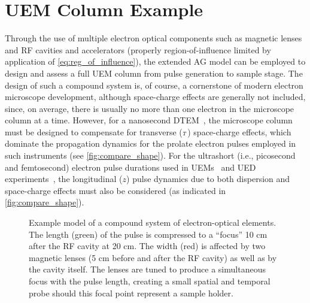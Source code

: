 
\section{UEM Column Example} \label{sec:compound}

Through the use of multiple electron optical components such as magnetic lenses and RF cavities and accelerators (properly region-of-influence limited by application of \ref{eq:reg_of_influence}), the extended AG model can be employed to design and assess a full UEM column from pulse generation to sample stage.
The design of such a compound system is, of course, a cornerstone of modern electron microscope development, although space-charge effects are generally not included, since, on average, there is usually no more than one electron in the microscope column at a time.
However, for a nanosecond DTEM~\cite{lagrange_nanosecond_2008,reed_evolution_2009}, the microscope column must be designed to compensate for transverse (${\scriptscriptstyle T}$) space-charge effects, which dominate the propagation dynamics for the prolate electron pulses employed in such instruments (see \ref{fig:compare_shape}).
For the ultrashort (i.e., picosecond and femtosecond) electron pulse durations used in UEMs~\cite{park_direct_2009} and UED experiments~\cite{oudheusden_electron_2007}, the longitudinal ($z$) pulse dynamics due to both dispersion and space-charge effects must also be considered (as indicated in \ref{fig:compare_shape}).

\begin{figure}
  \centering
  
  \caption[Example model of a compound system of electron-optical elements]{
    Example model of a compound system of electron-optical elements.
    The length (green) of the pulse is compressed to a ``focus'' 10 cm after the RF cavity at 20 cm.
    The width (red) is affected by two magnetic lenses (5 cm before and after the RF cavity) as well as by the cavity itself.
    The lenses are tuned to produce a simultaneous focus with the pulse length, creating a small spatial and temporal probe should this focal point represent a sample holder.
  }
  \label{fig:compound}
\end{figure}

